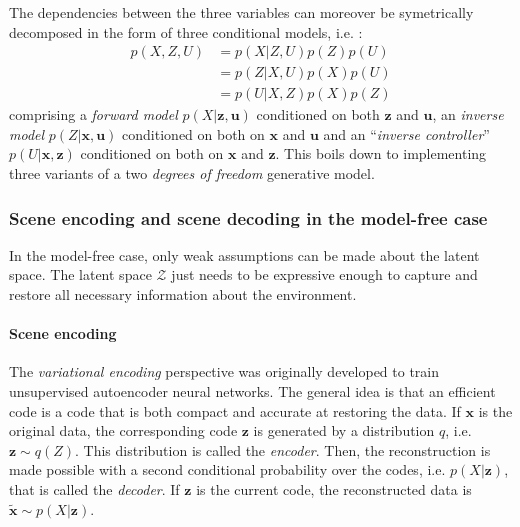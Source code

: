 \documentclass[12pt,twoside,openright]{article}
\begin{document}
The dependencies between the three variables can moreover be symetrically decomposed in the form of three conditional models, i.e. :
\begin{align}
p(X, Z, U) &= p(X| Z, U) p(Z)p(U)\nonumber\\ 
&= p(Z| X, U)p(X) p(U)\nonumber\\
&= p(U|X, Z)p(X) p(Z)\label{eq:three-party}
\end{align}
comprising a \emph{forward model} $p(X|\boldsymbol{z}, \boldsymbol{u})$ 
conditioned on both $\boldsymbol{z}$ and $\boldsymbol{u}$,  an \emph{inverse model} $p(Z|\boldsymbol{x}, \boldsymbol{u})$  conditioned on both on  $\boldsymbol{x}$ and $\boldsymbol{u}$ and an ``\emph{inverse controller}'' $p(U|\boldsymbol{x}, \boldsymbol{z})$ conditioned on both on  $\boldsymbol{x}$ and $\boldsymbol{z}$. This boils down to implementing three variants of a two \emph{degrees of freedom} generative model. 


\subsubsection{Scene encoding and scene decoding in the model-free case}

In the model-free case, only weak assumptions can be made about the latent space.  The latent space $\mathcal{Z}$ just needs to be expressive enough to capture and restore all necessary information about the environment.  

\paragraph{Scene encoding}\label{sec:encoding}
The \emph{variational encoding} perspective \cite{hinton1994autoencoders} was originally developed 
to train unsupervised autoencoder neural networks. The general idea is that an efficient code 
is a code that is both compact and accurate at restoring the data. 
If $\boldsymbol{x}$ is the original data, the corresponding code $\boldsymbol{z}$ is generated by a distribution $q$, i.e. $\boldsymbol{z} \sim q(Z)$. This distribution is called the \emph{encoder}. Then, the reconstruction is made possible with a second conditional probability over the codes, i.e. $p(X|\boldsymbol{z})$, that is called the \emph{decoder}. If $\boldsymbol{z}$ is the current code, the reconstructed data is $\tilde{\boldsymbol{x}} \sim p(X|\boldsymbol{z})$. 
 
\end{document}
